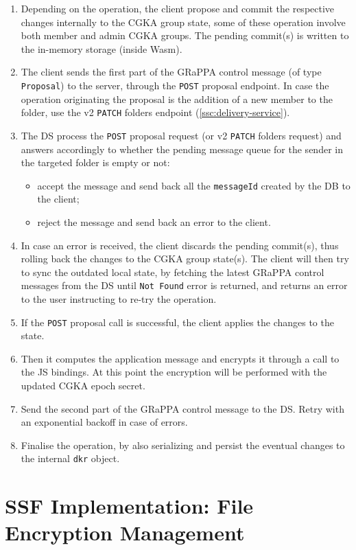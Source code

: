 \begin{enumerate}
    \item Depending on the operation, the client propose and commit the respective changes internally to the CGKA group state, some of these operation involve both member and admin CGKA groups. The pending commit(s) is written to the in-memory storage (inside Wasm).
    \item The client sends the first part of the GRaPPA control message (of type \texttt{Proposal}) to the server, through the \texttt{POST} proposal endpoint. In case the operation originating the proposal is the addition of a new member to the folder, use the v2 \texttt{PATCH} folders endpoint (\cref{ssc:delivery-service}).
    \item The DS process the \texttt{POST} proposal request (or v2 \texttt{PATCH} folders request) and answers accordingly to whether the pending message queue for the sender in the targeted folder is empty or not:
    \begin{itemize}
        \item accept the message and send back all the \texttt{messageId} created by the DB to the client;
        \item reject the message and send back an error to the client.
    \end{itemize}
    \item In case an error is received, the client discards the pending commit(s), thus rolling back the changes to the CGKA group state(s). The client will then try to sync the outdated local state, by fetching the latest GRaPPA control messages from the DS until \texttt{Not Found} error is returned, and returns an error to the user instructing to re-try the operation.
    \item If the \texttt{POST} proposal call is successful, the client applies the changes to the state. 
    \item Then it computes the application message and encrypts it through a call to the JS bindings. At this point the encryption will be performed with the updated CGKA epoch secret. 
    \item Send the second part of the GRaPPA control message to the DS. Retry with an exponential backoff in case of errors.
    \item Finalise the operation, by also serializing and persist the eventual changes to the internal \texttt{dkr} object.
\end{enumerate}

\section{SSF Implementation: File Encryption Management}\label{sc:ssf-file-encryption}


